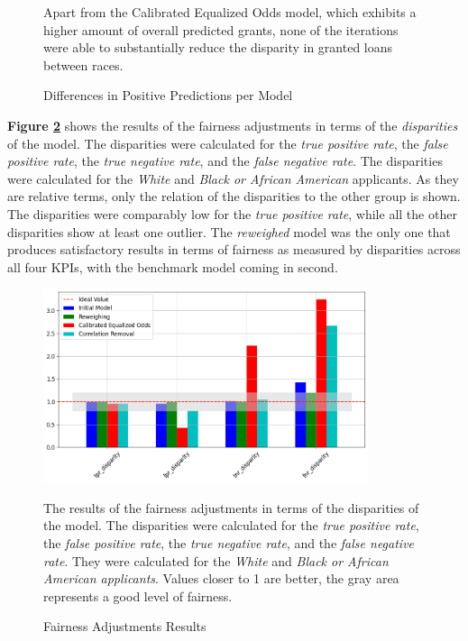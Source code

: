 \begin{figure}[!htbp]
    \caption{Differences in Positive Predictions per Model}
    \label{fig:Bar_Grant_per_Race}
    \medskip
    \small
    Apart from the Calibrated Equalized Odds model, which exhibits a higher amount of overall predicted grants, none of the iterations were able to substantially reduce the disparity in granted loans between races.
\end{figure}

\textbf{Figure \ref{fig:Fairness_Adjustments_Results_Line}} shows the results of the fairness adjustments in terms of the \textit{disparities} of the model. The disparities were calculated for the \textit{true positive rate}, the \textit{false positive rate}, the \textit{true negative rate}, and the \textit{false negative rate}. 
The disparities were calculated for the \textit{White} and \textit{Black or African American} applicants. As they are relative terms, only the relation of the disparities to the other group is shown.
The disparities were comparably low for the \textit{true positive rate}, while all the other disparities show at least one outlier. The \textit{reweighed} model was the only one that produces satisfactory results in terms of fairness as measured by disparities across all four KPIs, with the benchmark model coming in second.

\begin{figure}[!htbp]
    \centering
    \includegraphics[width=0.85\textwidth]{images/CHXX_Update_Results_Line.png}
    \caption{Fairness Adjustments Results}
    \medskip
    \small
    The results of the fairness adjustments in terms of the disparities of the model. The disparities were calculated for the \textit{true positive rate}, the \textit{false positive rate}, the \textit{true negative rate}, and the \textit{false negative rate}. They were calculated for the \textit{White} and \textit{Black or African American applicants}. Values closer to 1 are better, the gray area represents a good level of fairness.
    \label{fig:Fairness_Adjustments_Results_Line}
\end{figure}

